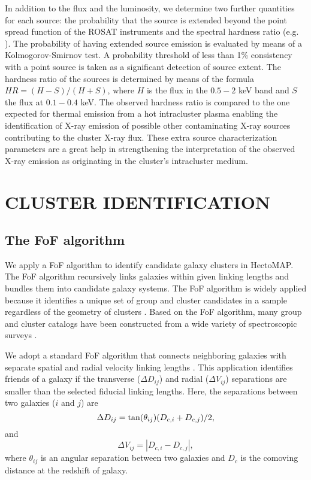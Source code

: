 \documentclass[iop, apj]{emulateapj}
\begin{document}
In addition to the flux and the luminosity, 
 we determine two further quantities for each source: 
 the probability that the source is extended beyond the point spread function of the ROSAT instruments
 and the spectral hardness ratio (e.g. \citealp{Bohringer13}). 
The probability of having extended source emission is evaluated by means of a Kolmogorov-Smirnov test. 
A probability threshold of less than 1\% consistency with a point source is taken 
 as a significant detection of source extent. 
The hardness ratio of the sources is determined by means of the formula $ HR = (H-S) / (H+S)$, 
 where $H$ is the flux in the $0.5 - 2$ keV band and 
 $S$ the flux at $0.1 - 0.4$ keV. 
The observed hardness ratio is compared to the one 
 expected for thermal emission from a hot intracluster plasma
 enabling the identification of X-ray emission of possible other 
 contaminating X-ray sources contributing to the cluster X-ray flux. 
These extra source characterization parameters are 
 a great help in strengthening 
 the interpretation of the observed X-ray emission 
 as originating in the cluster's intracluster medium. 

\section{CLUSTER IDENTIFICATION}\label{fof}

\subsection{The FoF algorithm}

We apply a FoF algorithm 
 to identify candidate galaxy clusters in HectoMAP. 
The FoF algorithm recursively links galaxies within 
 given linking lengths and bundles them 
 into candidate galaxy systems. 
The FoF algorithm is widely applied 
 because it identifies a unique set of group and cluster candidates in a sample 
 regardless of the geometry of clusters \citep{Berlind06}. 
Based on the FoF algorithm, 
 many group and cluster catalogs have been constructed 
 from a wide variety of spectroscopic surveys 
 \citep{Huchra82, Geller83, Ramella97, Ramella99, Barton96, Berlind06, Tago10, Robotham11, Tempel12, Tempel14, Tempel16, Sohn16}. 
 
We adopt a standard FoF algorithm 
 that connects neighboring galaxies with separate spatial and radial velocity linking lengths 
 \citep{Huchra82, Geller83}.
This application identifies friends of a galaxy 
 if the transverse ($\Delta D_{ij}$) and radial ($\Delta V_{ij}$) separations 
 are smaller than the selected fiducial linking lengths. 
Here, the separations between two galaxies ($i$ and $j$) are 
\begin{equation} 
\Delta D_{ij} =  {\rm tan} (\theta_{ij}) (D_{c, i} + D_{c, j}) / 2,
\end{equation}
 and
\begin{equation} 
\Delta V_{ij} = |D_{c, i} - D_{c, j}|, 
\end{equation}
 where $\theta_{ij}$ is an angular separation between two galaxies and
 $D_{c}$ is the comoving distance at the redshift of galaxy. 
 
\end{document}
